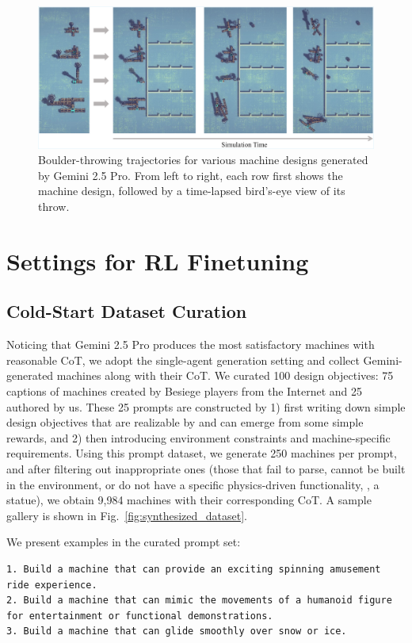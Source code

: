 \begin{figure}[h!]
  \centering
  \includegraphics[width=\linewidth]{figures/throw_comp_v4_cropped.pdf}
  \caption{\footnotesize Boulder-throwing trajectories for various machine designs generated by Gemini 2.5 Pro. From left to right, each row first shows the machine design, followed by a time-lapsed bird’s-eye view of its throw.}
  \label{fig:throw-traj}
\end{figure}


\clearpage
\newpage
\section{Settings for RL Finetuning}



\subsection{Cold-Start Dataset Curation} \label{sec:cold_start_data} 


Noticing that Gemini 2.5 Pro produces the most satisfactory machines with reasonable CoT, we adopt the single-agent generation setting and collect Gemini-generated machines along with their CoT. We curated 100 design objectives: 75 captions of machines created by Besiege players from the Internet and 25 authored by us. These 25 prompts are constructed by 1) first writing down simple design objectives that are realizable by \envname and can emerge from some simple rewards, and 2) then introducing environment constraints and machine-specific requirements. Using this prompt dataset, we generate 250 machines per prompt, and after filtering out inappropriate ones (those that fail to parse, cannot be built in the environment, or do not have a specific physics-driven functionality, \eg, a statue), we obtain 9,984 machines with their corresponding CoT. A sample gallery is shown in Fig.~\ref{fig:synthesized_dataset}.


We present examples in the curated prompt set: 
\begin{lstlisting}
1. Build a machine that can provide an exciting spinning amusement ride experience.
2. Build a machine that can mimic the movements of a humanoid figure for entertainment or functional demonstrations.
3. Build a machine that can glide smoothly over snow or ice.
\end{lstlisting}

